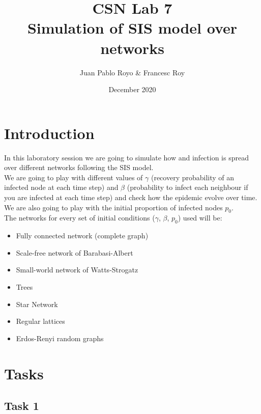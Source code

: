 \documentclass{article}
\title{CSN Lab 7 \\ Simulation of SIS model over networks}
\author{Juan Pablo Royo \& Francesc Roy}
\date{December 2020}
\begin{document}
\maketitle


\section{Introduction}

\noindent In this laboratory session we are going to simulate how and infection is spread over different networks following the SIS model.\\

\noindent We are going to play with different values of $\gamma$ (recovery probability of an infected node at each time step) and $\beta$ (probability to infect each neighbour if you are infected at each time step) and check how the epidemic evolve over time.\\

\noindent We are also going to play with the initial proportion of infected nodes $p_{0}$.\\

\noindent The networks for every set of initial conditions ($\gamma$, $\beta$, $p_{0}$) used will be: 

\begin{itemize}
  \item Fully connected network (complete graph)
  \item Scale-free network of Barabasi-Albert
  \item Small-world network of Watts-Strogatz
  \item Trees
  \item Star Network
  \item Regular lattices
  \item Erdos-Renyi random graphs\\
\end{itemize}









\newpage
\section{Tasks}
\subsection{Task 1}
\end{document}
